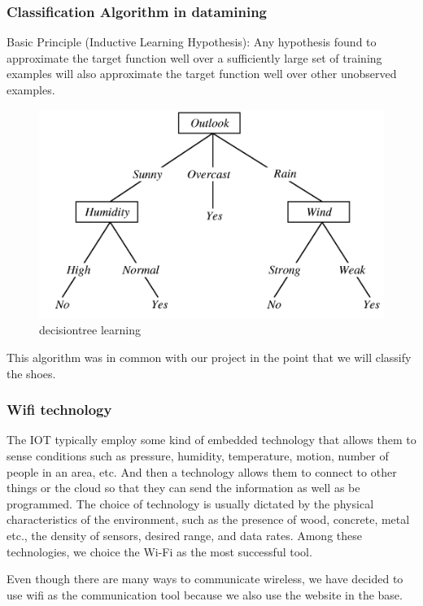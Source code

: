 \documentclass[conference]{IEEEtran}
\begin{document}
\subsubsection{Classification Algorithm in datamining}
Basic Principle (Inductive Learning Hypothesis): Any hypothesis found to approximate the target function well over a sufficiently large set of training examples will also approximate the target function well over other unobserved examples.
\begin{figure}[H]
\begin{center}
    \includegraphics[scale=0.5]{decisiontree_learning}
    \caption{decisiontree learning} \label{fig:label}
\end{center}
\end{figure}

This algorithm was in common with our project in the point that we will classify the shoes. 
\\
\subsubsection{Wifi technology}
The IOT typically employ some kind of embedded technology that allows them to sense conditions such as pressure, humidity, temperature, motion, number of people in an area, etc. And then a technology allows them to connect to other things or the cloud so that they can send the information as well as be programmed. The choice of technology is usually dictated by the physical characteristics of the environment, such as the presence of wood, concrete, metal etc., the density of sensors, desired range, and data rates. Among these technologies, we choice the Wi-Fi as the most successful tool.

Even though there are many ways to communicate wireless, we have decided to use wifi as the communication tool because we also use the website in the base.
\end{document}
